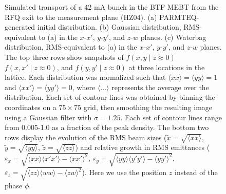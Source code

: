 \documentclass[%
 reprint,
nofootinbib,
 amsmath,amssymb,
 aps,
prstab,
]{revtex4-2}
\begin{document}
\begin{figure}
{        \label{fig:sim_b}%
    }%
    \hfill
    \caption{Simulated transport of a 42 mA bunch in the BTF MEBT from the RFQ exit to the measurement plane (HZ04). (a) PARMTEQ-generated initial distribution. (b) Gaussian distribution, RMS-equivalent to (a) in the $x$-$x'$, $y$-$y'$, and $z$-$w$ planes. (c) Waterbag distribution, RMS-equivalent to (a) in the $x$-$x'$, $y$-$y'$, and $z$-$w$ planes. The top three rows show snapshots of $f(x, y \mid z{\approx}0)$ $f(x, x' \mid z{\approx}0)$, and $f(y, y' \mid z{\approx}0)$ at three locations in the lattice. Each distribution was normalized such that $\langle{xx}\rangle = \langle{yy}\rangle = 1$ and $\langle{xx'}\rangle = \langle{yy'}\rangle = 0$, where $\langle\dots\rangle$ represents the average over the distribution. Each set of contour lines was obtained by binning the coordinates on a $75 \times 75$ grid, then smoothing the resulting image using a Gaussian filter with $\sigma = 1.25$. Each set of contour lines range from 0.005-1.0 as a fraction of the peak density. The bottom two rows display the evolution of the RMS beam sizes ($\tilde{x} = \sqrt{\langle{xx}\rangle}$, $\tilde{y} = \sqrt{\langle{yy}\rangle}$, $\tilde{z} = \sqrt{\langle{zz}\rangle}$) and relative growth in RMS emittances ($\varepsilon_x = \sqrt{\langle{xx}\rangle\langle{x'x'}\rangle - \langle{xx'}\rangle^2}$, $\varepsilon_y = \sqrt{\langle{yy}\rangle\langle{y'y'}\rangle - \langle{yy'}\rangle^2}$, $\varepsilon_z = \sqrt{\langle{zz}\rangle\langle{ww}\rangle - \langle{zw}\rangle^2}$). Here we use the position $z$ instead of the phase $\phi$.}
    \label{fig:sim}
\end{figure}
%
\end{document}
